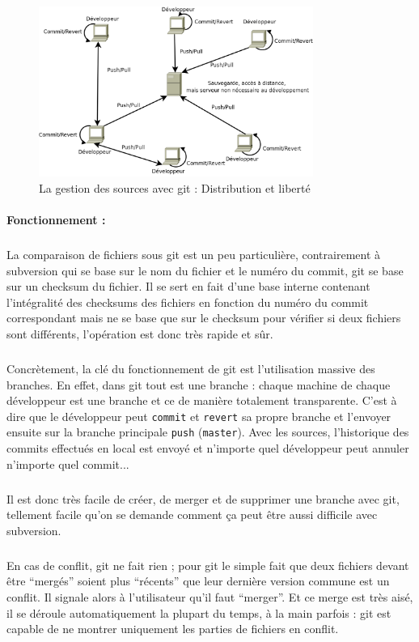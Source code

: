 \begin{figure}[!ht]
\begin{center}
        \includegraphics[width=0.8\textwidth]{./schema/git.png}
\caption{La gestion des sources avec git : Distribution et liberté}
\label{git}
\end{center}
\end{figure}

\paragraph{Fonctionnement :} 

\subparagraph{}La comparaison de fichiers sous git est un peu particulière, contrairement à subversion qui se base sur le nom du fichier et le numéro du commit, git se base sur un checksum du fichier. Il se sert en fait d'une base interne contenant l'intégralité des checksums des fichiers en fonction du numéro du commit correspondant mais ne se base que sur le checksum pour vérifier si deux fichiers sont différents, l'opération est donc très rapide et sûr.

\subparagraph{} Concrètement, la clé du fonctionnement de git est l'utilisation massive des branches. En effet, dans git tout est une branche : chaque machine de chaque développeur est une branche et ce de manière totalement transparente. C'est à dire que le développeur peut \verb|commit| et \verb|revert| sa propre branche et l'envoyer ensuite sur la branche principale \verb|push| (\verb|master|). Avec les sources, l'historique des commits effectués en local est envoyé et n'importe quel développeur peut annuler n'importe quel commit...

\subparagraph{} Il est donc très facile de créer, de merger et de supprimer une branche avec git, tellement facile qu'on se demande comment ça peut être aussi difficile avec subversion.

\subparagraph{} En cas de conflit, git ne fait rien ; pour git le simple fait que deux fichiers devant être ``mergés'' soient plus ``récents'' que leur dernière version commune est un conflit. Il signale alors à l'utilisateur qu'il faut ``merger''. Et ce merge est très aisé, il se déroule automatiquement la plupart du temps, à la main parfois : git est capable de ne montrer uniquement les parties de fichiers en conflit.


